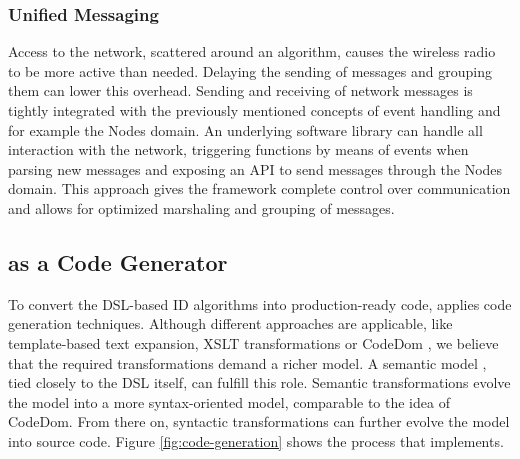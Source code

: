 \documentclass[3p,times,procedia]{elsarticle}
\begin{document}
\vspace{-1mm}
\subsubsection{Unified Messaging}
\label{dsl-unified-msg}

Access to the network, scattered around an algorithm, causes the wireless radio
to be more active than needed. Delaying the sending of messages and grouping
them can lower this overhead. Sending and receiving of network messages is
tightly integrated with the previously mentioned concepts of event handling and
for example the Nodes domain. An underlying software library can handle all
interaction with the network, triggering functions by means of events when
parsing new messages and exposing an API to send messages through the Nodes
domain. This approach gives the framework complete control over communication
and allows for optimized marshaling and grouping of messages.

\vspace{-1mm}
\subsection{\FOO as a Code Generator}

To convert the DSL-based ID algorithms into production-ready code, \FOO applies
code generation techniques. Although different approaches are applicable, like
template-based text expansion, XSLT transformations or CodeDom
\cite{dollard2004code}, we believe that the required transformations demand a
richer model. A semantic model \cite{fowler2010domain}, tied closely to the DSL
itself, can fulfill this role. Semantic transformations evolve the model into a
more syntax-oriented model, comparable to the idea of CodeDom. From there on,
syntactic transformations can further evolve the model into source code. Figure
\ref{fig:code-generation} shows the process that \FOO implements.
\end{document}
